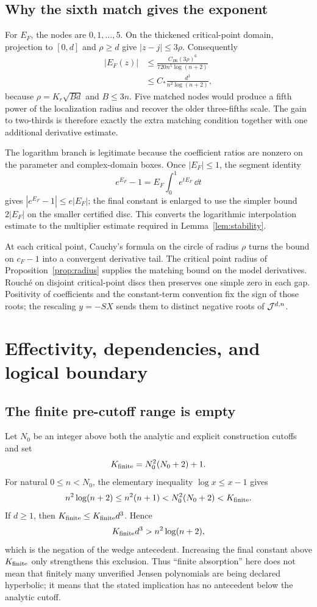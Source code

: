 \subsection{Why the sixth match gives the exponent}

For $E_F$, the nodes are $0,1,\ldots,5$.  On the thickened critical-point
domain, projection to $[0,d]$ and $\rho\ge d$ give $|z-j|\le3\rho$.
Consequently
\begin{align*}
 |E_F(z)|
 &\le\frac{C_{B6}(3\rho)^6}{720n^5\log(n+2)}\\
 &\le C_\ast\frac{d^3}{n^2\log(n+2)},
\end{align*}
because $\rho=K_r\sqrt{Bd}$ and $B\le3n$.  Five matched nodes would produce
a fifth power of the localization radius and recover the older three-fifths
scale.  The gain to two-thirds is therefore exactly the extra matching
condition together with one additional derivative estimate.

The logarithm branch is legitimate because the coefficient ratios are
nonzero on the parameter and complex-domain boxes.  Once $|E_F|\le1$, the
segment identity
\[
 e^{E_F}-1=E_F\int_0^1e^{tE_F}\,\dd t
\]
gives $|e^{E_F}-1|\le e|E_F|$; the final constant is enlarged to use the
simpler bound $2|E_F|$ on the smaller certified disc.  This converts the
logarithmic interpolation estimate to the multiplier estimate required in
Lemma~\ref{lem:stability}.

At each critical point, Cauchy's formula on the circle of radius $\rho$
turns the bound on $c_F-1$ into a convergent derivative tail.  The critical
point radius of Proposition~\ref{prop:radius} supplies the matching bound on
the model derivatives.  Rouch\'e on disjoint critical-point discs then
preserves one simple zero in each gap.  Positivity of coefficients and the
constant-term convention fix the sign of those roots; the rescaling
$y=-SX$ sends them to distinct negative roots of $\mathcal J^{d,n}$.

\section{Effectivity, dependencies, and logical boundary}\label{app:effectivity-details}

\subsection{The finite pre-cutoff range is empty}

Let $N_0$ be an integer above both the analytic and explicit construction
cutoffs and set
\[
 K_{\rm finite}=N_0^2(N_0+2)+1.
\]
For natural $0\le n<N_0$, the elementary inequality
$\log x\le x-1$ gives
\[
 n^2\log(n+2)\le n^2(n+1)<N_0^2(N_0+2)<K_{\rm finite}.
\]
If $d\ge1$, then $K_{\rm finite}\le K_{\rm finite}d^3$.  Hence
\[
 K_{\rm finite}d^3>n^2\log(n+2),
\]
which is the negation of the wedge antecedent.  Increasing the final constant
above $K_{\rm finite}$ only strengthens this exclusion.  Thus ``finite
absorption'' here does not mean that finitely many unverified Jensen
polynomials are being declared hyperbolic; it means that the stated
implication has no antecedent below the analytic cutoff.

